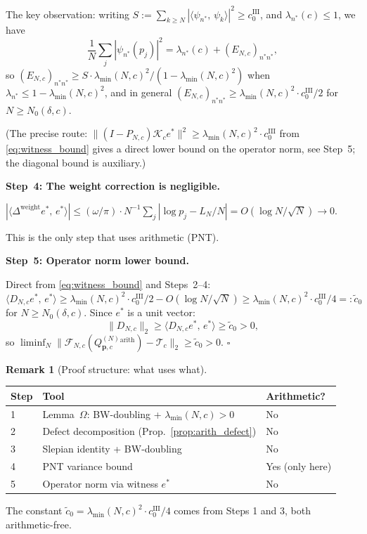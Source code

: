 \documentclass[12pt,a4paper]{amsart}
\theoremstyle{definition}
\newtheorem{remark}[theorem]{Remark}
\newcommand{\Kop}{\mathcal{K}_c}
\newcommand{\QM}{Q^{(N)}_{\mathbf{p},c}}
\newcommand{\ip}[2]{\langle #1,\, #2\rangle}
\newcommand{\Fcal}{\mathcal{F}_{N,c}}
\newcommand{\Tcal}{\mathcal{T}_c}
\newcommand{\PN}{P_{N,c}}
\newcommand{\lmin}{\lambda_{\min}(N,c)}
\begin{document}
The key observation: writing $S := \sum_{k\ge N}|\ip{\psi_{n^*}}{\psi_k}|^2
\ge c_0^{\mathrm{III}}$, and
$\lambda_{n^*}(c) \le 1$, we have
\[
  \frac{1}{N}\sum_j|\psi_{n^*}(p_j)|^2
  = \lambda_{n^*}(c) + (E_{N,c})_{n^*n^*},
\]
so $(E_{N,c})_{n^*n^*} \ge S\cdot\lmin^2/(1-\lmin^2)$
when $\lambda_{n^*}\le 1-\lmin^2$, and in general
$(E_{N,c})_{n^*n^*} \ge \lmin^2\cdot c_0^{\mathrm{III}}/2$
for $N \ge N_0(\delta,c)$.

(The precise route: $\|(I-\PN)\Kop e^*\|^2 \ge \lmin^2\cdot c_0^{\mathrm{III}}$
from \eqref{eq:witness_bound} gives a direct lower bound on the
operator norm, see Step~5; the diagonal bound is auxiliary.)

\medskip
\noindent\textbf{Step~4: The weight correction is negligible.}

$|\ip{\Delta^{\mathrm{weight}}e^*}{e^*}|
\le (\omega/\pi)\cdot N^{-1}\sum_j|\log p_j - L_N/N|
= O(\log N/\sqrt{N}) \to 0$.

This is the only step that uses arithmetic (PNT).

\medskip
\noindent\textbf{Step~5: Operator norm lower bound.}

Direct from \eqref{eq:witness_bound} and Steps~2--4:
$\ip{D_{N,c}e^*}{e^*}
\ge \lmin^2\cdot c_0^{\mathrm{III}}/2 - O(\log N/\sqrt{N})
\ge \lmin^2\cdot c_0^{\mathrm{III}}/4 =: \tilde c_0$
for $N\ge N_0(\delta,c)$.
Since $e^*$ is a unit vector:
\[
  \|D_{N,c}\|_2 \ge \ip{D_{N,c}e^*}{e^*} \ge \tilde c_0 > 0,
\]
so $\liminf_N\|\Fcal(\QM^{\mathrm{arith}})-\Tcal\|_2\ge\tilde c_0>0$.
\hfill$\square$

\begin{remark}[Proof structure: what uses what]
\begin{center}\small
\begin{tabular}{lll}
\toprule
Step & Tool & Arithmetic?\\
\midrule
1 & Lemma~$\Omega$: BW-doubling + $\lmin > 0$ & No \\
2 & Defect decomposition (Prop.~\ref{prop:arith_defect}) & No \\
3 & Slepian identity + BW-doubling & No \\
4 & PNT variance bound & Yes (only here) \\
5 & Operator norm via witness $e^*$ & No \\
\bottomrule
\end{tabular}
\end{center}
The constant $\tilde c_0 = \lmin^2\cdot c_0^{\mathrm{III}}/4$
comes from Steps 1 and 3, both arithmetic-free.
\end{remark}
\end{document}

